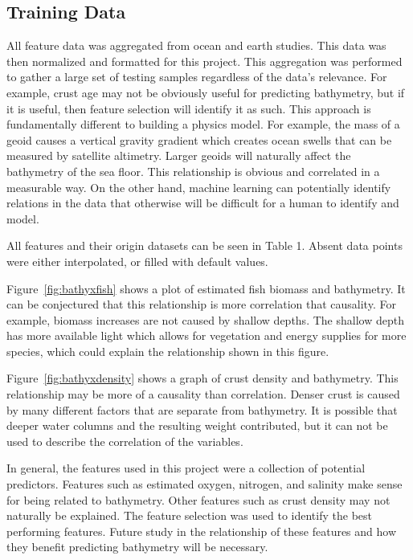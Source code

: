 \subsection{Training Data}
All feature data was aggregated from ocean and earth studies.
This data was then normalized and formatted for this project.
This aggregation was performed to gather a large set of testing samples regardless of the data's relevance.
For example, crust age may not be obviously useful for predicting bathymetry, but if it is useful, then feature selection will identify it as such.
This approach is fundamentally different to building a physics model.
For example, the mass of a geoid causes a vertical gravity gradient which creates ocean swells that can be measured by satellite altimetry.
Larger geoids will naturally affect the bathymetry of the sea floor.
This relationship is obvious and correlated in a measurable way.
On the other hand, machine learning can potentially identify relations in the data that otherwise will be difficult for a human to identify and model.

All features and their origin datasets can be seen in Table 1. %
Absent data points were either interpolated, or filled with default values.

\par
Figure~\ref{fig:bathyxfish} shows a plot of estimated fish biomass and bathymetry.
It can be conjectured that this relationship is more correlation that causality.
For example, biomass increases are not caused by shallow depths.
The shallow depth has more available light which allows for vegetation and energy supplies for more species, which could explain the relationship shown in this figure.

\par
Figure~\ref{fig:bathyxdensity} shows a graph of crust density and bathymetry.
This relationship may be more of a causality than correlation.
Denser crust is caused by many different factors that are separate from bathymetry.
It is possible that deeper water columns and the resulting weight contributed, but it can not be used to describe the correlation of the variables.

\par
In general, the features used in this project were a collection of potential predictors.
Features such as estimated oxygen, nitrogen, and salinity make sense for being related to bathymetry.
Other features such as crust density may not naturally be explained.
The feature selection was used to identify the best performing features.
Future study in the relationship of these features and how they benefit predicting bathymetry will be necessary.

